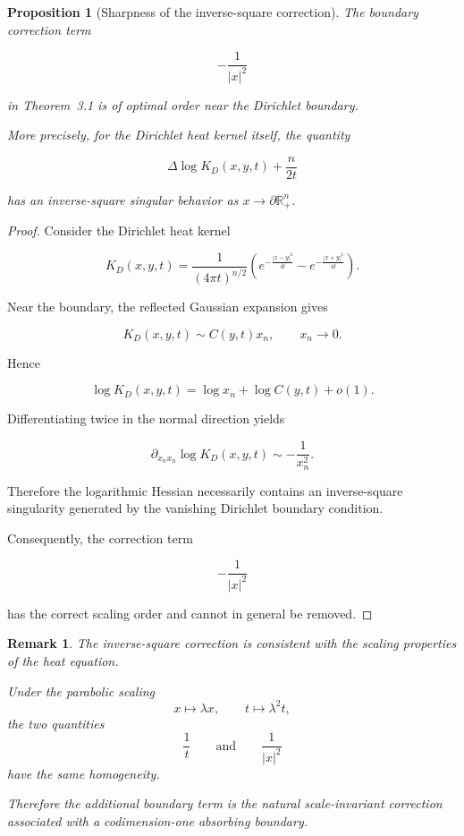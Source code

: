 \documentclass[10pt,a4paper]{amsart}
\newtheorem{proposition}[theorem]{Proposition}
\newtheorem{remark}[theorem]{Remark}
\begin{document}
\begin{proposition}[Sharpness of the inverse-square correction]

The boundary correction term

\[
-\frac1{|x|^2}
\]

in Theorem~3.1 is of optimal order near the Dirichlet boundary.

More precisely, for the Dirichlet heat kernel itself, the quantity

\[
\Delta \log K_D(x,y,t)
+
\frac n{2t}
\]

has an inverse-square singular behavior as
$x\rightarrow \partial\mathbb R^n_+$.

\end{proposition}

\begin{proof}

Consider the Dirichlet heat kernel

\[
K_D(x,y,t)
=
\frac1{(4\pi t)^{n/2}}
\left(
e^{-\frac{|x-y|^2}{4t}}
-
e^{-\frac{|x+y|^2}{4t}}
\right).
\]


Near the boundary, the reflected Gaussian expansion gives

\[
K_D(x,y,t)
\sim
C(y,t)x_n ,
\qquad x_n\rightarrow0 .
\]

Hence

\[
\log K_D(x,y,t)
=
\log x_n+\log C(y,t)+o(1).
\]

Differentiating twice in the normal direction yields

\[
\partial_{x_nx_n}
\log K_D(x,y,t)
\sim
-\frac1{x_n^2}.
\]

Therefore the logarithmic Hessian necessarily contains an
inverse-square singularity generated by the vanishing Dirichlet
boundary condition.

Consequently, the correction term

\[
-\frac1{|x|^2}
\]

has the correct scaling order and cannot in general be removed.

\end{proof}





\begin{remark}

The inverse-square correction is consistent with the scaling
properties of the heat equation.

Under the parabolic scaling
\[
x\mapsto \lambda x,
\qquad
t\mapsto \lambda^2t ,
\]
the two quantities
\[
\frac1t
\qquad\text{and}\qquad
\frac1{|x|^2}
\]
have the same homogeneity.

Therefore the additional boundary term is the natural
scale-invariant correction associated with a codimension-one
absorbing boundary.

\end{remark}
\end{document}
